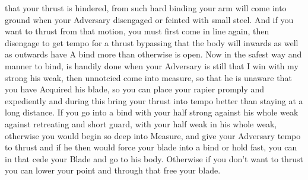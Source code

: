 \newpage


\newpage



that your thrust is hindered, from such hard binding your arm will
come into ground when your Adversary disengaged or feinted with
small steel. And if you want to thrust from that motion, you must
first come in line again, then disengage to get tempo for a thrust
bypassing that the body will inwards as well as outwards have A bind
more than otherwise is open. Now in the safest way and manner to
bind, is handily done when your Adversary is still that I win
with my strong his weak, then unnotcied come into measure, so that he
is unaware that you have Acquired his blade, so you can place your
rapier promply and expediently and during this bring your thrust into
tempo better than staying at a long distance. If you go into a bind
with your half strong against his whole weak against retreating and short
guard, with your half weak in his whole weak, otherwise you would
begin so deep into Measure, and give your Adversary tempo to thrust
and if he then would force your blade into a bind or hold fast, you
can in that cede your Blade and go to his body. Otherwise if you don't
want to thrust you can lower your point and through that free your
blade.

